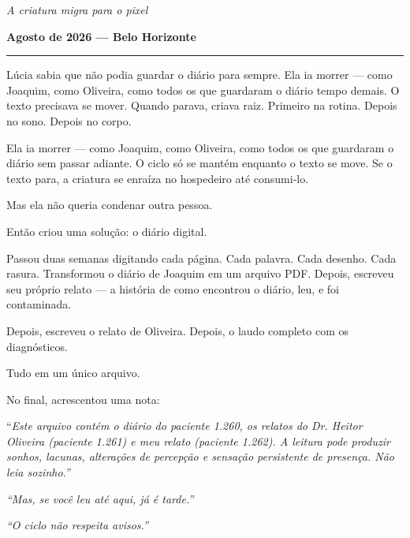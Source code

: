 
\noindent \textit{A criatura migra para o pixel}

\noindent \textbf{Agosto de 2026 --- Belo Horizonte}

\vspace{0.5em}\noindent\rule{\textwidth}{0.5pt}\vspace{0.5em}

\noindent Lúcia sabia que não podia guardar o diário para sempre.
\noindent Ela ia morrer --- como Joaquim, como Oliveira, como todos os que guardaram o diário tempo demais. O texto precisava se mover. Quando parava, criava raiz. Primeiro na rotina. Depois no sono. Depois no corpo.

\noindent Ela ia morrer --- como Joaquim, como Oliveira, como todos os que guardaram o diário sem passar adiante. O ciclo só se mantém enquanto o texto se move. Se o texto para, a criatura se enraíza no hospedeiro até consumi-lo.

\noindent Mas ela não queria condenar outra pessoa.

\noindent Então criou uma solução: o diário digital.

\noindent Passou duas semanas digitando cada página. Cada palavra. Cada desenho. Cada rasura. Transformou o diário de Joaquim em um arquivo PDF. Depois, escreveu seu próprio relato --- a história de como encontrou o diário, leu, e foi contaminada.

\noindent Depois, escreveu o relato de Oliveira. Depois, o laudo completo com os diagnósticos.

\noindent Tudo em um único arquivo.

\noindent No final, acrescentou uma nota:

\noindent \textquotedblleft{\textit{Este arquivo contém o diário do paciente 1.260, os relatos do Dr. Heitor Oliveira (paciente 1.261) e meu relato (paciente 1.262). A leitura pode produzir sonhos, lacunas, alterações de percepção e sensação persistente de presença. Não leia sozinho.\textquotedblright{}}}

\noindent \textit{\textquotedblleft{}Mas, se você leu até aqui, já é tarde.\textquotedblright{}}

\noindent \textit{\textquotedblleft{}O ciclo não respeita avisos.\textquotedblright{}}

